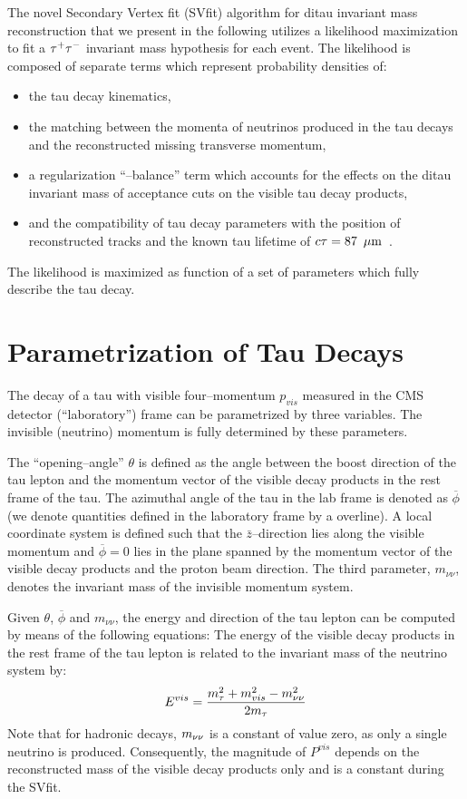 The novel Secondary Vertex fit (SVfit) algorithm for ditau invariant mass
reconstruction that we present in the following utilizes a likelihood
maximization to fit a $\tau^+\tau^-$ invariant mass hypothesis for each
event.  The likelihood is composed of separate terms which represent probability
densities of:
\begin{itemize}
\item the tau decay kinematics,
\item the matching between the momenta of neutrinos produced in the tau decays and
  the reconstructed missing transverse momentum,
\item a regularization ``\pt--balance'' term which accounts for the effects on the ditau invariant mass
 of acceptance cuts on the visible tau decay products,
\item and the compatibility of tau decay parameters with the position of reconstructed tracks
 and the known tau lifetime of $c\tau = 87~\,\mu\text{m}$~\cite{PDG}.
\end{itemize}
The likelihood is maximized as function of a set of parameters which fully describe the tau decay.

\section{Parametrization of Tau Decays}
\label{sec:svParameterization}

The decay of a tau with visible four--momentum $p_{vis}$ measured in the CMS
detector (``laboratory'') frame can be parametrized by three variables.  The
invisible (neutrino) momentum is fully determined by these parameters.

The ``opening--angle'' $\theta$ is defined as the angle between the boost
direction of the tau lepton and the momentum vector of the visible decay
products in the rest frame of the tau.  The azimuthal angle of the tau in the
lab frame is denoted as $\overline{\phi}$ (we denote quantities defined in the
laboratory frame by a overline).  A local coordinate system is defined such that the
$\bar{z}$--direction lies along the visible momentum and $\overline{\phi} = 0$ lies
in the plane spanned by the momentum vector of the visible decay products and
the proton beam direction. The third parameter, $m_{\nu\nu}$, denotes the
invariant mass of the invisible momentum system.

Given $\theta$, $\overline{\phi}$ and $m_{\nu\nu}$, the energy and direction of the
tau lepton can be computed by means of the following equations: The energy of
the visible decay products in the rest frame of the tau lepton is related to the
invariant mass of the neutrino system by:
\begin{equation}
E^{vis} = \frac{m_\tau^2 + m_{vis}^2 - m_{\nu\nu}^2}{2m_\tau} 
\label{eq:restFrameMomentumRelation}
\end{equation}
Note that for hadronic decays, $m_{\nu\nu}$ is a constant of value zero, as only a
single neutrino is produced.  Consequently, the magnitude of $P^{vis}$ depends
on the reconstructed mass of the visible decay products only and is a constant
during the SVfit.

